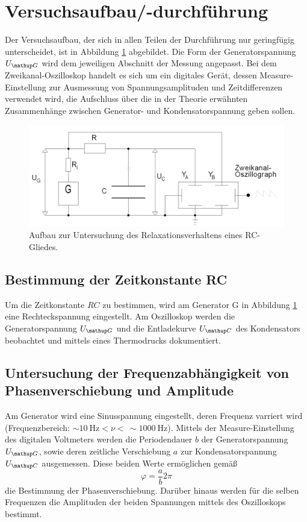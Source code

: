 \section{Versuchsaufbau/-durchführung}
Der Versuchsaufbau, der sich in allen Teilen der Durchführung nur geringfügig unterscheidet, ist in Abbildung \ref{fig: aufbau} abgebildet. %
Die Form der Generatorspannung $U\ua{G}$ wird dem jeweiligen Abschnitt der Messung angepasst. Bei dem Zweikanal-Oszilloskop handelt es sich um ein %
digitales Gerät, dessen Measure-Einstellung zur Ausmessung von Spannungsamplituden und Zeitdifferenzen verwendet wird, die Aufschluss über
die in der Theorie erwähnten Zusammenhänge zwischen Generator- und Kondensatorspannung geben sollen.
\begin{figure}
  \centering
  \includegraphics[width = \textwidth]{pics/aufbau.png}
  \caption{Aufbau zur Untersuchung des Relaxationsverhaltens eines RC-Gliedes.}
  \label{fig: aufbau}
\end{figure}

\subsection{Bestimmung der Zeitkonstante RC}
Um die Zeitkonstante $RC$ zu bestimmen, wird am Generator G in Abbildung \ref{fig: aufbau} eine Rechteckspannung eingestellt.
Am Oszilloskop werden die Generatorspannung $U\ua{G}$ und die Entladekurve $U\ua{C}$ des Kondensators beobachtet und mittels eines Thermodrucks %
dokumentiert.

\subsection{Untersuchung der Frequenzabhängigkeit von Phasenverschiebung und Amplitude}
Am Generator wird eine Sinusspannung eingestellt, deren Frequenz varriert wird (Frequenzbereich: $\sim\SI{10}{\hertz}<\nu<\, \sim\SI{1000}{\hertz}$). %
Mittels der Measure-Einstellung des digitalen Voltmeters werden die Periodendauer $b$ der
Generatorspannung $U\ua{G}$, sowie deren zeitliche Verschiebung $a$ zur Kondensatorspannung $U\ua{C}$ ausgemessen. Diese beiden Werte ermöglichen gemäß
\begin{equation}
  \varphi = \frac{a}{b}2\pi
  \label{eq:phasenverschiebung}
\end{equation}
die Bestimmung der Phasenverschiebung. Darüber hinaus werden für die selben Frequenzen die Amplituden der beiden Spannungen mittels des Oszilloskops
bestimmt.

